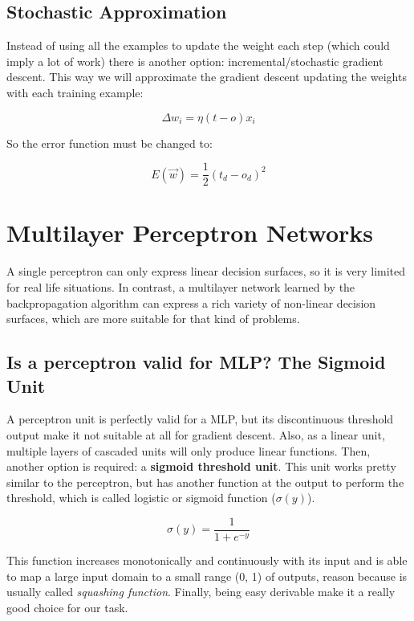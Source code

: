 	\subsection{Stochastic Approximation}
	Instead of using all the examples to update the weight each step (which could imply a lot of work) there is another option: incremental/stochastic gradient descent. This way we will approximate the gradient descent updating the weights with each training example:

	\begin{equation}
		\label{delta_rule}
		\Delta w_{i}= \eta (t - o) x_{i}
	\end{equation}

	So the error function must be changed to:

	\begin{equation}
		\label{error_function_stoc_square}
		E(\vec{w}) = \frac{1}{2} (t_d-o_d)^2 
	\end{equation}

\section{Multilayer Perceptron Networks}
A single perceptron can only express linear decision surfaces, so it is very limited for real life situations. In contrast, a multilayer network learned by the backpropagation algorithm can express a rich variety of non-linear decision surfaces, which are more suitable for that kind of problems.

	\subsection{Is a perceptron valid for MLP? The Sigmoid Unit}
	A perceptron unit is perfectly valid for a MLP, but its discontinuous threshold output make it not suitable at all for gradient descent. Also, as a linear unit, multiple layers of cascaded units will only produce linear functions. Then, another option is required: a \textbf{sigmoid threshold unit}. This unit works pretty similar to the perceptron, but has another function at the output to perform the threshold, which is called logistic or sigmoid function ($\sigma(y)$).

		\begin{equation}
			\label{sigmoid_function}
			\sigma(y) = \frac{1}{1+e^{-y}}
		\end{equation}

	This function increases monotonically and continuously with its input and is able to map a large input domain to a small range (0, 1) of outputs, reason because is usually called \textit{squashing function}. Finally, being easy derivable make it a really good choice for our task. 


